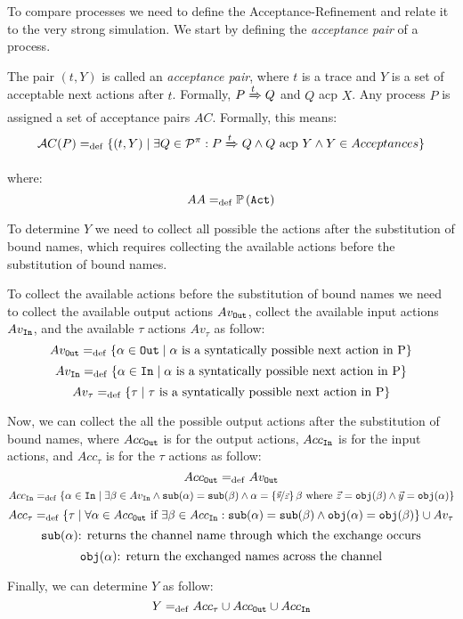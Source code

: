 To compare \picalc{} processes we need to define the Acceptance-Refinement and relate it to the very strong simulation. We start by defining the \textit{acceptance pair} of a process.

The pair $(t, Y)$ is called an \textit{acceptance pair}, where $t$ is a trace and $Y$ is a set of acceptable next actions after $t$. Formally, $P \xRightarrow{t} Q$ and $Q$ acp $X$. Any process
$P$ is assigned a set of acceptance pairs $AC$. Formally, this means:
\begin{align}
    \Accepatances[P] \define \{(t,Y) \mid \exists Q\in\procs: P \bigstep{t} Q \wedge Q \text{ acp } Y \wedge Y\in Acceptances\}
\label{failure}
\end{align}

where: 
\[AA =_{\mathrm{def}} \mathbb P\left(\mathtt{Act}\right)\]

To determine $Y$ we need to collect all possible the actions after the substitution of bound names, which requires collecting the available actions before the substitution of bound names.

To collect the available actions before the substitution of bound names we need to collect the available output actions $Av_{\mathtt{Out}}$, collect the available input actions $Av_{\mathtt{In}}$, and the available $\tau$ actions $Av_\tau$ as follow:
\[Av_{\mathtt{Out}}=_{\mathrm{def}}\{ \alpha \in \mathtt{Out} \mid \alpha\text{ is a syntatically possible next action in P}\}\]
\[Av_{\mathtt{In}}=_{\mathrm{def}}\{ \alpha \in \mathtt{In} \mid \alpha\text{ is a syntatically possible next action in P}\}\]
\[Av_\tau=_{\mathrm{def}}\{ \tau \mid \tau\text{ is a syntatically possible next action in P}\}\]

Now, we can collect the all the possible output actions after the substitution of bound names, where $Acc_{\mathtt{Out}}$ is for the output actions, $Acc_{\mathtt{In}}$ is for the input actions, and $Acc_\tau$ is for the $\tau$ actions as follow:
\[Acc_{\mathtt{Out}} =_{\mathrm{def}} Av_{\mathtt{Out}}\]
\[Acc_{\mathtt{In}}=_{\mathrm{def}}\{\alpha \in \mathtt{In} \mid \exists \beta \in Av_{\mathtt{In}} \wedge \mathtt{sub}(\alpha)=\mathtt{sub}(\beta) \wedge \alpha=\left\{\nicefrac{\vec{y}}{\vec{z}}\right\}\beta \text{ where } \vec{z}=\mathtt{obj}(\beta) \wedge \vec{y}=\mathtt{obj}(\alpha) \}\]
\[Acc_\tau=_{\mathrm{def}}\{\tau \mid \forall \alpha \in Acc_{\mathtt{Out}} \text{ if } \exists \beta \in Acc_{\mathtt{In}}  :\mathtt{sub}(\alpha)=\mathtt{sub}(\beta) \wedge \mathtt{obj}(\alpha)=\mathtt{obj}(\beta)  \}\cup Av_\tau\]
\[\mathtt{sub}(\alpha) \text{: returns the channel name through which the exchange occurs}\]
\[\mathtt{obj}(\alpha) \text{: return the exchanged names across the channel}\]

Finally, we can determine $Y$ as follow:
\[Y =_{\mathrm{def}} Acc_\tau \cup Acc_{\mathtt{Out}} \cup Acc_{\mathtt{In}}\]

